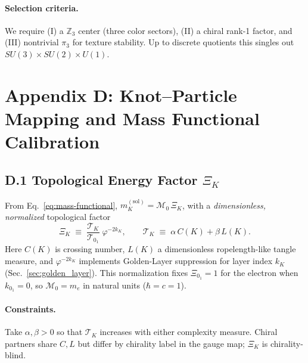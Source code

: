 \documentclass[smallextended]{svjour3}       %
\begin{document}
		\paragraph{Selection criteria.}
		We require (I) a \(\mathbb Z_3\) center (three color sectors), (II) a chiral rank-1 factor, and (III) nontrivial \(\pi_3\) for texture stability.
		Up to discrete quotients this singles out \(SU(3)\times SU(2)\times U(1)\).

	\section*{Appendix D: Knot–Particle Mapping and Mass Functional Calibration}
	\label{sec:knot-particle-mapping}

		\subsection*{D.1 Topological Energy Factor \texorpdfstring{\(\Xi_K\)}{XiK}}
		From Eq.~\eqref{eq:mass-functional},
		\(m_K^{(\mathrm{sol})}=\mathcal{M}_0\,\Xi_K\),
		with a \emph{dimensionless, normalized} topological factor
		\begin{equation}
		\Xi_K \;\equiv\; \frac{\mathcal{T}_K}{\mathcal{T}_{0_1}}\;\varphi^{-2k_K},
		\qquad \mathcal{T}_K \;\equiv\; \alpha\,C(K) + \beta\,L(K).
		\label{eq:Xi-normalized}
		\end{equation}
		Here \(C(K)\) is crossing number, \(L(K)\) a dimensionless ropelength-like tangle measure, and \(\varphi^{-2k_K}\) implements Golden-Layer suppression for layer index \(k_K\) (Sec.~\ref{sec:golden_layer}). This normalization fixes
		\(\Xi_{0_1}=1\) for the electron when \(k_{0_1}=0\), so \(\mathcal{M}_0=m_e\) in natural units (\(\hbar=c=1\)).

		\paragraph{Constraints.}
		Take \(\alpha,\beta>0\) so that \(\mathcal{T}_K\) increases with either complexity measure.
		Chiral partners share \(C,L\) but differ by chirality label in the gauge map; \(\Xi_K\) is chirality-blind.
\end{document}
